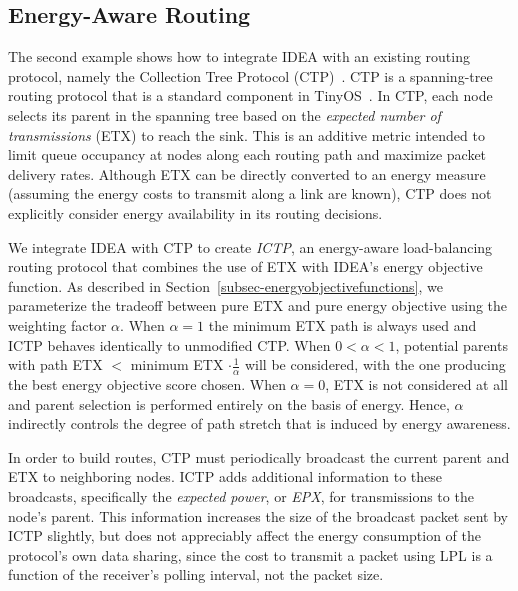 \documentclass{sig-alternate}
\begin{document}
\subsection{Energy-Aware Routing}
\label{subsec-ictpcasestudy}

The second example shows how to integrate IDEA with an existing routing
protocol, namely the Collection Tree Protocol (CTP)~\cite{ctp-sensys09}. CTP
is a spanning-tree routing protocol that is a standard component in
TinyOS~\cite{tinyos-asplos00}. In CTP, each node selects its parent in the
spanning tree based on the \textit{expected number of transmissions} (ETX) to
reach the sink. This is an additive metric intended to limit queue occupancy
at nodes along each routing path and maximize packet delivery rates. Although
ETX can be directly converted to an energy measure (assuming the energy costs
to transmit along a link are known), CTP does not explicitly consider energy
availability in its routing decisions.

We integrate IDEA with CTP to create \textit{ICTP}, an energy-aware
load-balancing routing protocol that combines the use of ETX with IDEA's
energy objective function. As described in
Section~\ref{subsec-energyobjectivefunctions}, we parameterize the tradeoff
between pure ETX and pure energy objective using the weighting factor
$\alpha$. When $\alpha = 1$ the minimum ETX path is always used and ICTP
behaves identically to unmodified CTP. When $0 < \alpha < 1$, potential
parents with path ETX $<$ minimum ETX $\cdot \frac{1}{\alpha}$ will be
considered, with the one producing the best energy objective score chosen.
When $\alpha = 0$, ETX is not considered at all and parent selection is
performed entirely on the basis of energy. Hence, $\alpha$ indirectly
controls the degree of path stretch that is induced by energy awareness. 

\vfill\eject

In order to build routes, CTP must periodically broadcast the current parent
and ETX to neighboring nodes. ICTP adds additional information to these
broadcasts, specifically the \textit{expected power}, or \textit{EPX}, for
transmissions to the node's parent. This information increases the size of
the broadcast packet sent by ICTP slightly, but does not appreciably affect
the energy consumption of the protocol's own data sharing, since the cost to
transmit a packet using LPL is a function of the receiver's polling interval,
not the packet size.
\end{document}
